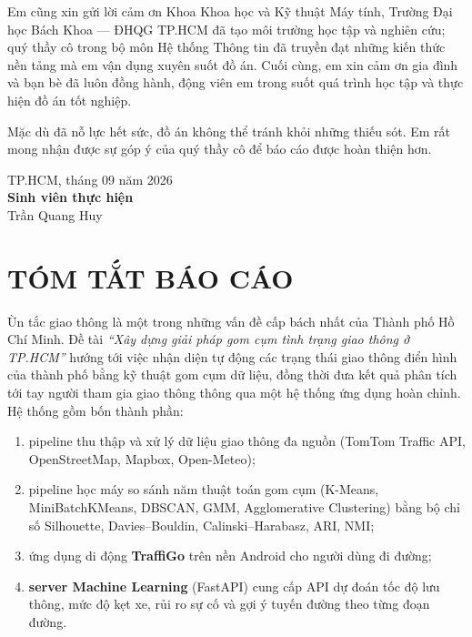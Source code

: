 \documentclass[12pt,a4paper]{report}
\begin{document}
Em cũng xin gửi lời cảm ơn Khoa Khoa học và Kỹ thuật Máy tính, Trường Đại học Bách Khoa --- ĐHQG TP.HCM đã tạo môi trường học tập và nghiên cứu; quý thầy cô trong bộ môn Hệ thống Thông tin đã truyền đạt những kiến thức nền tảng mà em vận dụng xuyên suốt đồ án. Cuối cùng, em xin cảm ơn gia đình và bạn bè đã luôn đồng hành, động viên em trong suốt quá trình học tập và thực hiện đồ án tốt nghiệp.

Mặc dù đã nỗ lực hết sức, đồ án không thể tránh khỏi những thiếu sót. Em rất mong nhận được sự góp ý của quý thầy cô để báo cáo được hoàn thiện hơn.

\begin{flushright}
TP.HCM, tháng 09 năm 2026\\
\textbf{Sinh viên thực hiện}\\[24pt]
Trần Quang Huy
\end{flushright}

\chapter*{TÓM TẮT BÁO CÁO}

Ùn tắc giao thông là một trong những vấn đề cấp bách nhất của Thành phố Hồ Chí Minh. Đề tài \textit{``Xây dựng giải pháp gom cụm tình trạng giao thông ở TP.HCM''} hướng tới việc nhận diện tự động các trạng thái giao thông điển hình của thành phố bằng kỹ thuật gom cụm dữ liệu, đồng thời đưa kết quả phân tích tới tay người tham gia giao thông thông qua một hệ thống ứng dụng hoàn chỉnh. Hệ thống gồm bốn thành phần:
\begin{enumerate}[label=(\roman*),leftmargin=2.2cm,itemsep=2pt]
    \item pipeline thu thập và xử lý dữ liệu giao thông đa nguồn (TomTom Traffic API, OpenStreetMap, Mapbox, Open-Meteo);
    \item pipeline học máy so sánh năm thuật toán gom cụm (K-Means, MiniBatchKMeans, DBSCAN, GMM, Agglomerative Clustering) bằng bộ chỉ số Silhouette, Davies--Bouldin, Calinski--Harabasz, ARI, NMI;
    \item ứng dụng di động \textbf{TraffiGo} trên nền Android cho người dùng đi đường;
    \item \textbf{server Machine Learning} (FastAPI) cung cấp API dự đoán tốc độ lưu thông, mức độ kẹt xe, rủi ro sự cố và gợi ý tuyến đường theo từng đoạn đường.
\end{enumerate}
\end{document}
